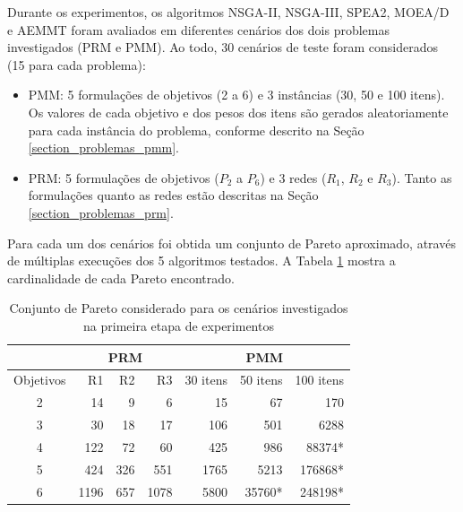 Durante os experimentos, os algoritmos NSGA-II, NSGA-III, SPEA2, MOEA/D e AEMMT foram avaliados em diferentes cenários dos dois problemas investigados (PRM e PMM). Ao todo, 30 cenários de teste foram considerados (15 para cada problema):

\begin{itemize}
	\item PMM: 5 formulações de objetivos (2 a 6) e 3 instâncias (30, 50 e 100 itens). Os valores de cada objetivo e dos pesos dos itens são gerados aleatoriamente para cada instância do problema, conforme descrito na Seção \ref{section_problemas_pmm}.
	\item PRM: 5 formulações de objetivos ($P_2$ a $P_6$) e 3 redes ($R_1$, $R_2$ e $R_3$). Tanto as formulações quanto as redes estão descritas na Seção \ref{section_problemas_prm}.
\end{itemize}

Para cada um dos cenários foi obtida um conjunto de Pareto aproximado, através de múltiplas execuções dos 5 algoritmos testados. A Tabela \ref{table_exp1_paretos} mostra a cardinalidade de cada Pareto encontrado.

\begin{table}[!htbp]
	\centering
	\caption{Conjunto de Pareto considerado para os cenários investigados na primeira etapa de experimentos}
	\label{table_exp1_paretos}
	\begin{tabular}{c|rrr|rrr}
		& \multicolumn{3}{c|}{\textbf{PRM}} & \multicolumn{3}{c}{\textbf{PMM}} \\ \hline
		Objetivos & R1         & R2       & R3        & 30 itens  & 50 itens & 100 itens \\ \hline
		2         & 14         & 9        & 6         & 15        & 67       & 170       \\
		3         & 30         & 18       & 17        & 106       & 501      & 6288      \\
		4         & 122        & 72       & 60        & 425       & 986      & 88374*    \\
		5         & 424        & 326      & 551       & 1765      & 5213     & 176868*   \\
		6         & 1196       & 657      & 1078      & 5800      & 35760*   & 248198*   \\ \hline
	\end{tabular}
\end{table}

